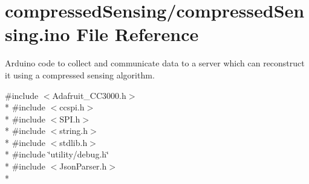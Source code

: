 \hypertarget{compressed_sensing_8ino}{\section{compressed\+Sensing/compressed\+Sensing.ino File Reference}
\label{compressed_sensing_8ino}
}


Arduino code to collect and communicate data to a server which can reconstruct it using a compressed sensing algorithm.  


{\ttfamily \#include $<$Adafruit\+\_\+\+C\+C3000.\+h$>$}\\*
{\ttfamily \#include $<$ccspi.\+h$>$}\\*
{\ttfamily \#include $<$S\+P\+I.\+h$>$}\\*
{\ttfamily \#include $<$string.\+h$>$}\\*
{\ttfamily \#include $<$stdlib.\+h$>$}\\*
{\ttfamily \#include \char`\"{}utility/debug.\+h\char`\"{}}\\*
{\ttfamily \#include $<$Json\+Parser.\+h$>$}\\*

